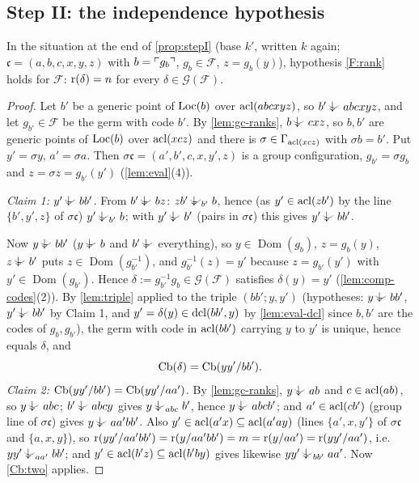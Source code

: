 \subsection{Step II: the independence hypothesis}

\begin{proposition}[Step II]\label{prop:stepII}
In the situation at the end of \cref{prop:stepI} (base $k'$, written $k$ again;
$\mathfrak c=(a,b,c,x,y,z)$ with $b=\ulcorner g_b\urcorner$, $g_b\in\mathcal F$, $z=g_b(y)$),
hypothesis \ref{F:rank} holds for $\mathcal F$: $\operatorname{r}(\delta)=n$ for every
$\delta\in\mathcal G(\mathcal F)$.
\end{proposition}
\begin{proof}
Let $b'$ be a generic point of $\operatorname{Loc}(b)$ over $\operatorname{acl}(abcxyz)$, so $b'\ind{}abcxyz$, and
let $g_{b'}\in\mathcal F$ be the germ with code $b'$.  By \cref{lem:gc-ranks},
$b\ind{}cxz$, so $b,b'$ are generic points of $\operatorname{Loc}(b)$ over $\operatorname{acl}(xcz)$ and there is
$\sigma\in\Gamma_{\operatorname{acl}(xcz)}$ with $\sigma b=b'$.  Put $y'=\sigma y$, $a'=\sigma a$.  Then
$\sigma\mathfrak c=(a',b',c,x,y',z)$ is a group configuration, $g_{b'}=\sigma g_b$ and
$z=\sigma z=g_{b'}(y')$ (\cref{lem:eval}(4)).

\emph{Claim 1: $y'\ind{}bb'$.}  From $b'\ind{}bz$: $zb'\ind{b'}b$, hence (as
$y'\in\operatorname{acl}(zb')$ by the line $\{b',y',z\}$ of $\sigma\mathfrak c$) $y'\ind{b'}b$; with
$y'\ind{}b'$ (pairs in $\sigma\mathfrak c$) this gives $y'\ind{}bb'$.

Now $y\ind{}bb'$ ($y\ind{}b$ and $b'\ind{}$ everything), so $y\in\operatorname{Dom}(g_b)$,
$z=g_b(y)$, $z\ind{}b'$ puts $z\in\operatorname{Dom}(g_{b'}^{-1})$, and
$g_{b'}^{-1}(z)=y'$ because $z=g_{b'}(y')$ with $y'\in\operatorname{Dom}(g_{b'})$.  Hence
$\delta:=g_{b'}^{-1}g_b\in\mathcal G(\mathcal F)$ satisfies $\delta(y)=y'$
(\cref{lem:comp-codes}(2)).  By \cref{lem:triple} applied to the triple $(bb';y,y')$
(hypotheses: $y\ind{}bb'$, $y'\ind{}bb'$ by Claim 1, and $y'=\delta(y)\in\operatorname{dcl}(bb',y)$ by
\cref{lem:eval-dcl} since $b,b'$ are the codes of $g_b,g_{b'}$), the germ with code in
$\operatorname{acl}(bb')$ carrying $y$ to $y'$ is unique, hence equals $\delta$, and
\[
  \operatorname{Cb}(\delta)=\operatorname{Cb}(yy'/bb').
\]
\emph{Claim 2: $\operatorname{Cb}(yy'/bb')=\operatorname{Cb}(yy'/aa')$.}  By \cref{lem:gc-ranks}, $y\ind{}ab$ and
$c\in\operatorname{acl}(ab)$, so $y\ind{}abc$; $b'\ind{}abcy$ gives $y\ind{abc}b'$, hence $y\ind{}abcb'$;
and $a'\in\operatorname{acl}(cb')$ (group line of $\sigma\mathfrak c$) gives $y\ind{}aa'bb'$.  Also
$y'\in\operatorname{acl}(a'x)\subseteq\operatorname{acl}(a'ay)$ (lines $\{a',x,y'\}$ of $\sigma\mathfrak c$ and
$\{a,x,y\}$), so $\operatorname{r}(yy'/aa'bb')=\operatorname{r}(y/aa'bb')=m=\operatorname{r}(y/aa')=\operatorname{r}(yy'/aa')$, i.e.\
$yy'\ind{aa'}bb'$; and $y'\in\operatorname{acl}(b'z)\subseteq\operatorname{acl}(b'by)$ gives likewise
$yy'\ind{bb'}aa'$.  Now \ref{Cb:two} applies.


\end{proof}
